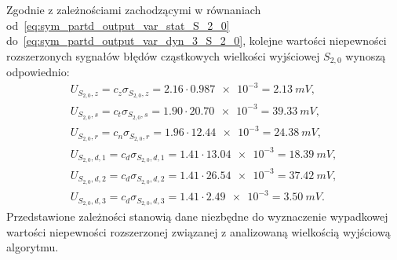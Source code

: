 Zgodnie z zależnościami zachodzącymi w równaniach od~\eqref{eq:sym_partd_output_var_stat_S_2_0} do~\eqref{eq:sym_partd_output_var_dyn_3_S_2_0}, kolejne wartości niepewności rozszerzonych sygnałów błędów cząstkowych wielkości wyjściowej $S_{2,0}$ wynoszą odpowiednio:
\begin{gather}
U_{S_{2,0},z} = c_{z} \sigma_{S_{2,0},z} = \num{2.16} \cdot \num{0.987e-3} = \qty{2.13}{mV} \label{eq:sym_partd_output_unc_roun_S_2_0},\\
U_{S_{2,0},s} = c_{t} \sigma_{S_{2,0},s} = \num{1.90} \cdot \num{20.70e-3} = \qty{39.33}{mV} \label{eq:sym_partd_output_unc_stat_S_2_0}, \\
U_{S_{2,0},r} = c_{n} \sigma_{S_{2,0},r} = \num{1.96} \cdot \num{12.44e-3} = \qty{24.38}{mV} \label{eq:sym_partd_output_unc_rand_S_2_0}, \\
U_{S_{2,0},d,1} = c_{d} \sigma_{S_{2,0},d,1} = \num{1.41} \cdot \num{13.04e-3} = \qty{18.39}{mV} \label{eq:sym_partd_output_unc_dyn_1_S_2_0}, \\
U_{S_{2,0},d,2} = c_{d} \sigma_{S_{2,0},d,2} = \num{1.41} \cdot \num{26.54e-3} = \qty{37.42}{mV} \label{eq:sym_partd_output_unc_dyn_2_S_2_0}, \\
U_{S_{2,0},d,3} = c_{d} \sigma_{S_{2,0},d,3} = \num{1.41} \cdot \num{2.49e-3} = \qty{3.50}{mV} \label{eq:sym_partd_output_unc_dyn_3_S_2_0}.
\end{gather}
Przedstawione zależności stanowią dane niezbędne do wyznaczenie wypadkowej wartości niepewności rozszerzonej związanej z analizowaną wielkością wyjściową algorytmu.

